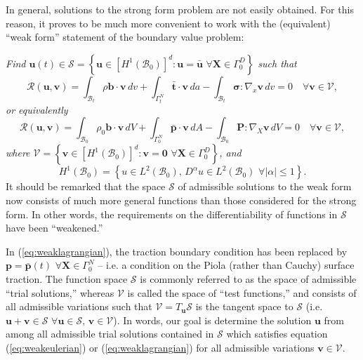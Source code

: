In general, solutions to the strong form problem are not easily obtained. For this reason, it proves to be much more convenient to work with the (equivalent) ``weak form'' statement of the boundary value problem:

\textit{Find $\mathbf{u}(t) \in \mathcal{S} = \left\{ \mathbf{u} \in \left[H^{1} (\mathcal{B}_0)\right]^d \colon \mathbf{u} = \bar{\mathbf{u}} \, \, \forall \mathbf{X} \in \Gamma^D_0 \right\}$ such that}
\begin{equation}
  \mathcal{R}(\mathbf{u}, \mathbf{v}) = \int_{\mathcal{B}_t} \rho \mathbf{b} \cdot \mathbf{v} \, dv + \int_{\Gamma^N_t} \bar{\mathbf{t}} \cdot \mathbf{v} \, da - \int_{\mathcal{B}_t} \boldsymbol{\sigma} \colon \nabla_x \mathbf{v} \, dv = 0 \quad \forall \mathbf{v} \in \mathcal{V},
  \label{eq:weakeulerian}
\end{equation}
\textit{or equivalently}
\begin{equation}
  \mathcal{R}(\mathbf{u}, \mathbf{v}) = \int_{\mathcal{B}_0} \rho_0 \mathbf{b} \cdot \mathbf{v} \, dV + \int_{\Gamma^N_0} \bar{\mathbf{p}} \cdot \mathbf{v} \, dA - \int_{\mathcal{B}_0} \mathbf{P} \colon \nabla_X \mathbf{v} \, dV = 0 \quad \forall \mathbf{v} \in \mathcal{V},
  \label{eq:weaklagrangian}
\end{equation}
\textit{where $\mathcal{V} = \left\{ \mathbf{v} \in \left[H^{1} (\mathcal{B}_0)\right]^d \colon \mathbf{v} = \mathbf{0} \, \, \forall \mathbf{X} \in \Gamma^D_0 \right\}$, and}
\begin{equation}
  H^{1} (\mathcal{B}_0) = \left\{ u \in L^2 (\mathcal{B}_0), \, D^{\alpha} u \in L^2 (\mathcal{B}_0) \, \, \forall | \alpha | \leq 1 \right\}.
\end{equation}
It should be remarked that the space $\mathcal{S}$ of admissible solutions to the weak form now consists of much more general functions than those considered for the strong form. In other words, the requirements on the differentiability of functions in $\mathcal{S}$ have been ``weakened.''

In (\ref{eq:weaklagrangian}), the traction boundary condition has been replaced by $\mathbf{p} = \bar{\mathbf{p}}(t) \, \, \forall \mathbf{X} \in \Gamma^N_0$ -- i.e. a condition on the Piola (rather than Cauchy) surface traction. The function space $\mathcal{S}$ is commonly referred to as the space of admissible ``trial solutions,'' whereas $\mathcal{V}$ is called the space of ``test functions,'' and consists of all admissible variations such that $\mathcal{V} = T_{\mathbf{u}} \mathcal{S}$ is the tangent space to $\mathcal{S}$ (i.e. $\mathbf{u} + \mathbf{v} \in \mathcal{S} \, \, \forall \mathbf{u} \in \mathcal{S}, \, \mathbf{v} \in \mathcal{V}$). In words, our goal is determine the solution $\mathbf{u}$ from among all admissible trial solutions contained in $\mathcal{S}$ which satisfies equation (\ref{eq:weakeulerian}) or (\ref{eq:weaklagrangian}) for all admissible variations $\mathbf{v} \in \mathcal{V}$.

